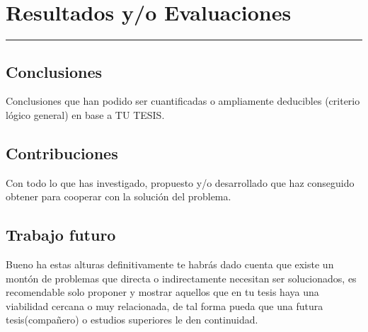 \chapter{Resultados y/o Evaluaciones}
\hrule \bigskip \vspace*{1cm}

\section{Conclusiones}

Conclusiones que han podido ser cuantificadas o ampliamente
deducibles (criterio lógico general) en base a TU TESIS.

\section{Contribuciones}

Con todo lo que has investigado, propuesto y/o desarrollado que haz
conseguido obtener para cooperar con la solución del problema.

\section{Trabajo futuro}

Bueno ha estas alturas definitivamente te habrás dado cuenta que
existe un montón de problemas que directa o indirectamente necesitan
ser solucionados, es recomendable solo proponer y mostrar aquellos
que en tu tesis haya una viabilidad cercana o muy relacionada, de
tal forma pueda que una futura tesis(compañero) o estudios
superiores le den continuidad.
